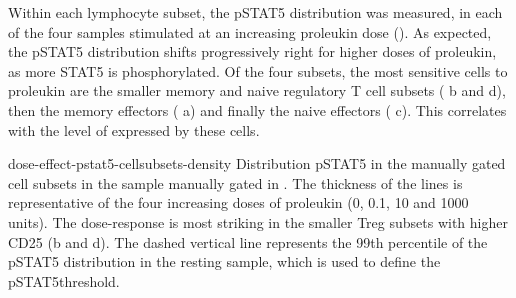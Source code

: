 Within each lymphocyte subset, the pSTAT5 distribution was measured, in each of the four samples stimulated at an increasing proleukin dose
().  
As expected, the pSTAT5 distribution shifts progressively right for higher doses of proleukin, as more STAT5 is phosphorylated.
Of the four subsets, the most sensitive cells to proleukin are the smaller memory and naive regulatory T cell subsets ( b and d),
then the memory effectors ( a) and finally the naive effectors ( c).
This correlates with the level of  expressed by these cells.

{dose-effect-pstat5-cellsubsets-density}
{ Distribution pSTAT5 in the manually gated cell subsets in the sample manually gated in . }
{
The thickness of the lines is representative of the four increasing doses of proleukin (0, 0.1, 10 and 1000 units).
The dose-response is most striking in the smaller Treg subsets with higher CD25 (b and d).
The dashed vertical line represents the 99th percentile of the pSTAT5 distribution in the resting sample,
which is used to define the pSTAT5\positive threshold.
}

